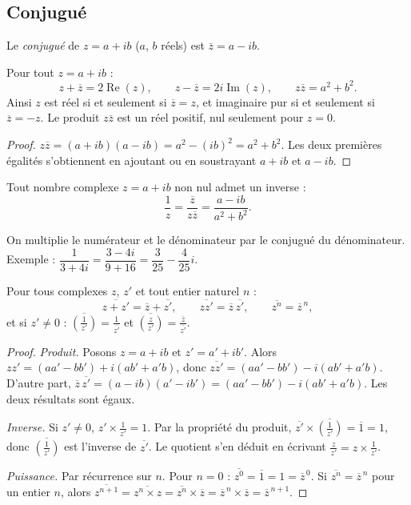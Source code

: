 \subsection{Conjugué}
\begin{definition}[Conjugué]
Le \emph{conjugué} de $z=a+ib$ ($a$, $b$ réels) est $\overline{z}=a-ib$.
\end{definition}
\begin{theorem}
Pour tout $z=a+ib$ :
\[z+\overline z=2\operatorname{Re}(z),\qquad z-\overline z=2i\operatorname{Im}(z),\qquad z\overline z=a^2+b^2.\]
Ainsi $z$ est réel si et seulement si $\overline z=z$, et imaginaire pur si et seulement si $\overline z=-z$. Le produit $z\overline z$ est un réel positif, nul seulement pour $z=0$.
\end{theorem}
\begin{proof}
$z\overline z=(a+ib)(a-ib)=a^2-(ib)^2=a^2+b^2$. Les deux premières égalités s'obtiennent en ajoutant ou en soustrayant $a+ib$ et $a-ib$.
\end{proof}
\begin{theorem}
Tout nombre complexe $z=a+ib$ non nul admet un inverse :
\[\frac1z=\frac{\overline z}{z\overline z}=\frac{a-ib}{a^2+b^2}.\]
\end{theorem}
\begin{method}
On multiplie le numérateur et le dénominateur par le conjugué du dénominateur. Exemple : $\dfrac{1}{3+4i}=\dfrac{3-4i}{9+16}=\dfrac{3}{25}-\dfrac{4}{25}i$.
\end{method}
\begin{theorem}
Pour tous complexes $z$, $z'$ et tout entier naturel $n$ :
\[\overline{z+z'}=\overline z+\overline{z'},\qquad\overline{zz'}=\overline z\,\overline{z'},\qquad\overline{z^n}=\overline z^{\,n},\]
et si $z'\neq0$ : $\overline{\left(\frac1{z'}\right)}=\frac1{\overline{z'}}$ et $\overline{\left(\frac z{z'}\right)}=\frac{\overline z}{\overline{z'}}$.
\end{theorem}
\begin{proof}
\emph{Produit.} Posons $z=a+ib$ et $z'=a'+ib'$. Alors $zz'=(aa'-bb')+i(ab'+a'b)$, donc $\overline{zz'}=(aa'-bb')-i(ab'+a'b)$. D'autre part, $\overline z\,\overline{z'}=(a-ib)(a'-ib')=(aa'-bb')-i(ab'+a'b)$. Les deux résultats sont égaux.\par
\emph{Inverse.} Si $z'\neq0$, $z'\times\frac1{z'}=1$. Par la propriété du produit, $\overline{z'}\times\overline{\left(\frac1{z'}\right)}=\overline1=1$, donc $\overline{\left(\frac1{z'}\right)}$ est l'inverse de $\overline{z'}$. Le quotient s'en déduit en écrivant $\frac z{z'}=z\times\frac1{z'}$.\par
\emph{Puissance.} Par récurrence sur $n$. Pour $n=0$ : $\overline{z^0}=\overline1=1=\overline z^{\,0}$. Si $\overline{z^n}=\overline z^{\,n}$ pour un entier $n$, alors $\overline{z^{n+1}}=\overline{z^n\times z}=\overline{z^n}\times\overline z=\overline z^{\,n}\times\overline z=\overline z^{\,n+1}$.
\end{proof}

